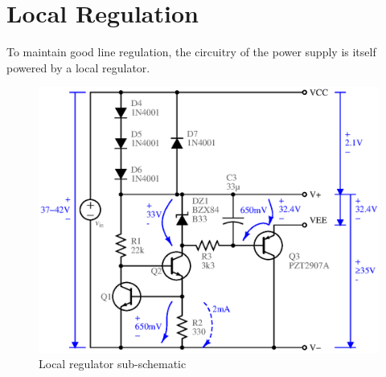 \section{Local Regulation}

To maintain good line regulation, the circuitry of the power supply is itself
powered by a local regulator.

\begin{figure}[H]
\centering
\includegraphics[width=5.5in]{sch/localregs}
\caption{Local regulator sub-schematic}
\label{fig:localreg}
\end{figure}

